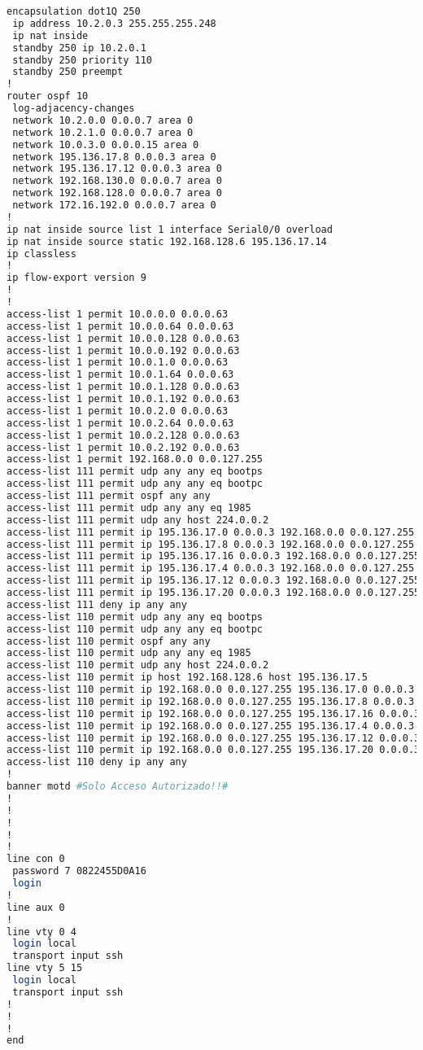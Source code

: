 \begin{lstlisting}[language=Bash, caption={Configuración Completa Router Auxiliar 1}]
 encapsulation dot1Q 250
 ip address 10.2.0.3 255.255.255.248
 ip nat inside
 standby 250 ip 10.2.0.1
 standby 250 priority 110
 standby 250 preempt
!
router ospf 10
 log-adjacency-changes
 network 10.2.0.0 0.0.0.7 area 0
 network 10.2.1.0 0.0.0.7 area 0
 network 10.0.3.0 0.0.0.15 area 0
 network 195.136.17.8 0.0.0.3 area 0
 network 195.136.17.12 0.0.0.3 area 0
 network 192.168.130.0 0.0.0.7 area 0
 network 192.168.128.0 0.0.0.7 area 0
 network 172.16.192.0 0.0.0.7 area 0
!
ip nat inside source list 1 interface Serial0/0 overload
ip nat inside source static 192.168.128.6 195.136.17.14 
ip classless
!
ip flow-export version 9
!
!
access-list 1 permit 10.0.0.0 0.0.0.63
access-list 1 permit 10.0.0.64 0.0.0.63
access-list 1 permit 10.0.0.128 0.0.0.63
access-list 1 permit 10.0.0.192 0.0.0.63
access-list 1 permit 10.0.1.0 0.0.0.63
access-list 1 permit 10.0.1.64 0.0.0.63
access-list 1 permit 10.0.1.128 0.0.0.63
access-list 1 permit 10.0.1.192 0.0.0.63
access-list 1 permit 10.0.2.0 0.0.0.63
access-list 1 permit 10.0.2.64 0.0.0.63
access-list 1 permit 10.0.2.128 0.0.0.63
access-list 1 permit 10.0.2.192 0.0.0.63
access-list 1 permit 192.168.0.0 0.0.127.255
access-list 111 permit udp any any eq bootps
access-list 111 permit udp any any eq bootpc
access-list 111 permit ospf any any
access-list 111 permit udp any any eq 1985
access-list 111 permit udp any host 224.0.0.2
access-list 111 permit ip 195.136.17.0 0.0.0.3 192.168.0.0 0.0.127.255
access-list 111 permit ip 195.136.17.8 0.0.0.3 192.168.0.0 0.0.127.255
access-list 111 permit ip 195.136.17.16 0.0.0.3 192.168.0.0 0.0.127.255
access-list 111 permit ip 195.136.17.4 0.0.0.3 192.168.0.0 0.0.127.255
access-list 111 permit ip 195.136.17.12 0.0.0.3 192.168.0.0 0.0.127.255
access-list 111 permit ip 195.136.17.20 0.0.0.3 192.168.0.0 0.0.127.255
access-list 111 deny ip any any
access-list 110 permit udp any any eq bootps
access-list 110 permit udp any any eq bootpc
access-list 110 permit ospf any any
access-list 110 permit udp any any eq 1985
access-list 110 permit udp any host 224.0.0.2
access-list 110 permit ip host 192.168.128.6 host 195.136.17.5
access-list 110 permit ip 192.168.0.0 0.0.127.255 195.136.17.0 0.0.0.3
access-list 110 permit ip 192.168.0.0 0.0.127.255 195.136.17.8 0.0.0.3
access-list 110 permit ip 192.168.0.0 0.0.127.255 195.136.17.16 0.0.0.3
access-list 110 permit ip 192.168.0.0 0.0.127.255 195.136.17.4 0.0.0.3
access-list 110 permit ip 192.168.0.0 0.0.127.255 195.136.17.12 0.0.0.3
access-list 110 permit ip 192.168.0.0 0.0.127.255 195.136.17.20 0.0.0.3
access-list 110 deny ip any any
!
banner motd #Solo Acceso Autorizado!!#
!
!
!
!
!
line con 0
 password 7 0822455D0A16
 login
!
line aux 0
!
line vty 0 4
 login local
 transport input ssh
line vty 5 15
 login local
 transport input ssh
!
!
!
end


\end{lstlisting}
